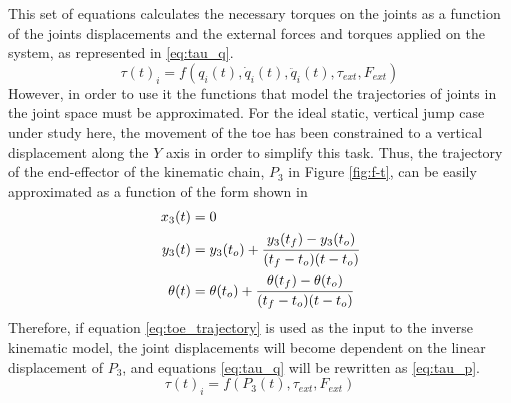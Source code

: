 This set of equations calculates the necessary torques on the joints as a function of the joints displacements and the external forces and torques applied on the system, as represented in \ref{eq:tau_q}.
\begin{equation}
\label{eq:tau_q}
	\tau(t)_{i} = f(q_{i}(t), \dot{q}_{i}(t), \ddot{q}_{i}(t), \tau_{ext}, F_{ext})
\end{equation}
However, in order to use it the functions that model the trajectories of joints in the joint space must be approximated.
For the ideal static, vertical jump case under study here, the movement of the toe has been constrained to a vertical displacement along the $Y$ axis in order to simplify this task.
Thus, the trajectory of the end-effector of the kinematic chain, $P_{3}$ in Figure \ref{fig:f-t}, can be easily approximated as a function of the form shown in 
\begin{equation}
\label{eq:toe_trajectory}
	\begin{aligned}
	x_{3}(t) &= 0 \\
	y_{3}(t) &= y_{3}(t_{o}) + \cfrac{y_{3}(t_{f}) - y_{3}(t_{o})}{(t_{f} - t_{o}) (t - t_{o})} \\
    \theta(t) &= \theta(t_{o}) + \cfrac{\theta(t_{f}) - \theta(t_{o})}{(t_{f} - t_{o}) (t - t_{o})} 
    \end{aligned}
\end{equation}
Therefore, if equation \ref{eq:toe_trajectory} is used as the input to the inverse kinematic model, the joint displacements will become dependent on the linear displacement of $P_{3}$, and equations \ref{eq:tau_q} will be rewritten as \ref{eq:tau_p}.
\begin{equation}
\label{eq:tau_p}
	\tau(t)_{i} = f(P_{3}(t), \tau_{ext}, F_{ext})
\end{equation}